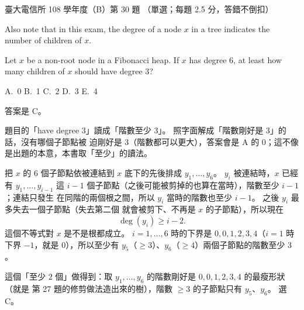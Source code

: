 \begin{pastexam}[label={px:ntu-108-comm-dsab-30}]{臺大電信所 108 學年度（B）第 30 題}
（單選；每題 2.5 分，答錯不倒扣）

Also note that in this exam, the degree of a node $x$ in a tree indicates the number of children
of $x$.

Let $x$ be a non-root node in a Fibonacci heap. If $x$ has degree 6, at least how many children
of $x$ should have degree 3?

A.~0 \qquad B.~1 \qquad C.~2 \qquad D.~3 \qquad E.~4
\end{pastexam}

\begin{pastsoln}
答案是 C。

題目的「have degree 3」讀成「階數至少 $3$」。 照字面解成「階數剛好是 $3$」的話，沒有哪個子節點被
迫剛好是 $3$（階數都可以更大），答案會是 A 的 $0$；這不像是出題的本意，本書取「至少」的讀法。

把 $x$ 的 $6$ 個子節點依被連結到 $x$ 底下的先後排成 $y_1, \ldots, y_6$。 $y_i$ 被連結時，$x$ 已經有
$y_1, \ldots, y_{i-1}$ 這 $i - 1$ 個子節點（之後可能被剪掉的也算在當時），階數至少 $i - 1$；連結只發生
在同階的兩個根之間，所以 $y_i$ 當時的階數也至少 $i - 1$。 之後 $y_i$ 最多失去一個子節點（失去第二個
就會被剪下、不再是 $x$ 的子節點），所以現在
\[
\deg(y_i) \ge i - 2.
\]
這個不等式對 $x$ 是不是根都成立。 $i = 1, \ldots, 6$ 時的下界是 $0, 0, 1, 2, 3, 4$（$i = 1$ 時下界
$-1$，就是 $0$），所以至少有 $y_5$（$\ge 3$）、$y_6$（$\ge 4$）兩個子節點的階數至少 $3$。

這個「至少 $2$ 個」做得到：取 $y_1, \ldots, y_6$ 的階數剛好是 $0, 0, 1, 2, 3, 4$ 的最瘦形狀（就是
第 27 題的修剪做法造出來的樹），階數 $\ge 3$ 的子節點只有 $y_5$、$y_6$。 選 C。
\end{pastsoln}
